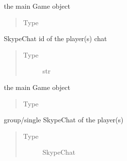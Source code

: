 \documentclass[letterpaper,10pt,english]{sphinxmanual}
\begin{document}
\begin{fulllineitems}
\begin{fulllineitems}
\begin{quote}
\begin{description}
\end{description}\end{quote}

\end{fulllineitems}



\begin{fulllineitems}
the main Game object
\begin{quote}\begin{description}
\item[{Type}] \leavevmode
{\hyperref[\detokenize{chatwolf:chatwolf.game.Game}]{}}

\end{description}\end{quote}

\end{fulllineitems}



\begin{fulllineitems}
SkypeChat id of the player(s) chat
\begin{quote}\begin{description}
\item[{Type}] \leavevmode
str

\end{description}\end{quote}

\end{fulllineitems}



\begin{fulllineitems}
the main Game object
\begin{quote}\begin{description}
\item[{Type}] \leavevmode
{\hyperref[\detokenize{chatwolf:chatwolf.game.Game}]{}}

\end{description}\end{quote}

\end{fulllineitems}



\begin{fulllineitems}
group/single SkypeChat of the player(s)
\begin{quote}\begin{description}
\item[{Type}] \leavevmode
SkypeChat


\end{description}
\end{quote}
\end{fulllineitems}
\end{fulllineitems}
\end{document}
